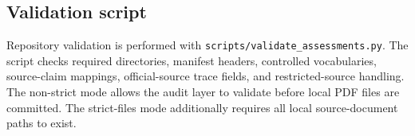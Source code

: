 \subsection{Validation script}

Repository validation is performed with \texttt{scripts/validate\_assessments.py}. The script checks required directories, manifest headers, controlled vocabularies, source-claim mappings, official-source trace fields, and restricted-source handling. The non-strict mode allows the audit layer to validate before local PDF files are committed. The strict-files mode additionally requires all local source-document paths to exist.

